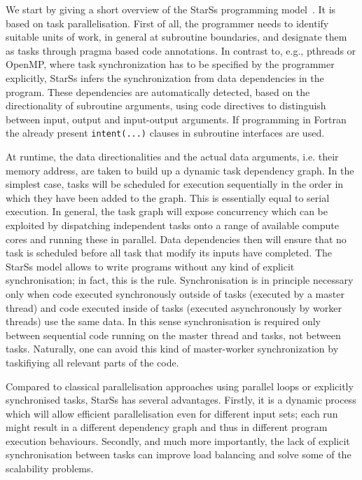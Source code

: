 \documentclass[conference]{IEEEtran}
\newcommand{\starss}{{StarSs}}
\begin{document}
We start by giving a short overview of the \starss{} programming
model~\cite{*Ss:BPBL06}. It is based on task parallelisation.  First
of all, the programmer needs to identify suitable units of work, in
general at subroutine boundaries, and designate them as tasks through
pragma based code annotations. 
In contrast to, e.g., pthreads or OpenMP, where task synchronization
has to be specified by the programmer explicitly, \starss{} infers the synchronization from
data dependencies in the program. These dependencies are automatically
detected, based on the directionality of subroutine arguments,
using code directives to distinguish between
input, output and input-output arguments. If programming in Fortran
the already present 
\verb!intent(...)!  clauses in subroutine interfaces are used.

At runtime, the data directionalities and the actual data arguments,
i.e. their memory address, are taken to build up a dynamic task
dependency graph. In the simplest case, tasks will be scheduled for
execution sequentially in the order in which they have been added to
the graph. This is essentially equal to serial execution. In general, the
task graph will expose concurrency which can be exploited by
dispatching independent tasks onto a range of available compute cores and running these
in parallel. Data dependencies then will ensure that no task is
scheduled before all task that modify its inputs have completed. 
The \starss{} model allows to write programs without any kind of
explicit synchronisation; in fact, this is the rule. Synchronisation
is in principle necessary only when code executed synchronously
outside of tasks (executed by a master thread) and code executed
inside of tasks (executed asynchronously by worker threads) use the same
data. In this sense synchronisation is required only between
sequential code running on the master thread and tasks, not between
tasks. Naturally, one can avoid this kind of master-worker
synchronization by taskifiying all relevant parts of the code.

Compared to classical parallelisation approaches using parallel loops
or explicitly synchronised tasks, \starss{} has several
advantages. Firstly, it is a dynamic process which will allow
efficient parallelisation even for different input sets; each run
might result in a different dependency graph and thus in different
program execution behaviours. Secondly, and much more importantly, the
lack of explicit synchronisation between tasks can improve load
balancing and solve some of the scalability problems.
\end{document}
